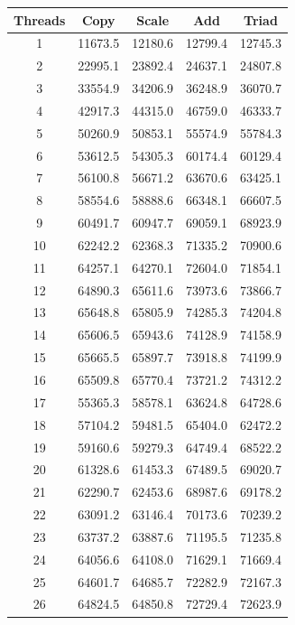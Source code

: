 \documentclass[12pt,a4paper,USenglish]{article}      %
\begin{document}
\begin{table}[!hbtp]
\centering
\begin{tabular}{ |c|c|c|c|c| }
\hline
Threads & Copy & Scale & Add & Triad \\
\hline
1 & 11673.5 & 12180.6 & 12799.4 & 12745.3 \\
\hline
2 & 22995.1 & 23892.4 & 24637.1 & 24807.8 \\
\hline
3 & 33554.9 & 34206.9 & 36248.9 & 36070.7 \\
\hline
4 & 42917.3 & 44315.0 & 46759.0 & 46333.7 \\
\hline
5 & 50260.9 & 50853.1 & 55574.9 & 55784.3 \\
\hline
6 & 53612.5 & 54305.3 & 60174.4 & 60129.4 \\
\hline
7 & 56100.8 & 56671.2 & 63670.6 & 63425.1 \\
\hline
8 & 58554.6 & 58888.6 & 66348.1 & 66607.5 \\
\hline
9 & 60491.7 & 60947.7 & 69059.1 & 68923.9 \\
\hline
10 & 62242.2 & 62368.3 & 71335.2 & 70900.6 \\
\hline
11 & 64257.1 & 64270.1 & 72604.0 & 71854.1 \\
\hline
12 & 64890.3 & 65611.6 & 73973.6 & 73866.7 \\
\hline
13 & 65648.8 & 65805.9 & 74285.3 & 74204.8 \\
\hline
14 & 65606.5 & 65943.6 & 74128.9 & 74158.9 \\
\hline
15 & 65665.5 & 65897.7 & 73918.8 & 74199.9 \\
\hline
16 & 65509.8 & 65770.4 & 73721.2 & 74312.2 \\
\hline
17 & 55365.3 & 58578.1 & 63624.8 & 64728.6 \\
\hline
18 & 57104.2 & 59481.5 & 65404.0 & 62472.2 \\
\hline
19 & 59160.6 & 59279.3 & 64749.4 & 68522.2 \\
\hline
20 & 61328.6 & 61453.3 & 67489.5 & 69020.7 \\
\hline
21 & 62290.7 & 62453.6 & 68987.6 & 69178.2 \\
\hline
22 & 63091.2 & 63146.4 & 70173.6 & 70239.2 \\
\hline
23 & 63737.2 & 63887.6 & 71195.5 & 71235.8 \\
\hline
24 & 64056.6 & 64108.0 & 71629.1 & 71669.4 \\
\hline
25 & 64601.7 & 64685.7 & 72282.9 & 72167.3 \\
\hline
26 & 64824.5 & 64850.8 & 72729.4 & 72623.9 \\

\end{tabular}
\end{table}
\end{document}
